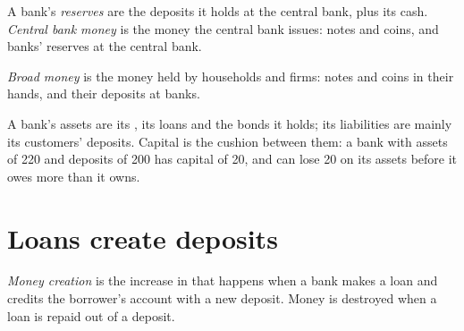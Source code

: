 \begin{definition}\label{def:g11:money-and-banking:reserves}
A bank's \emph{reserves} are the deposits it holds at the central bank, plus its cash. \emph{Central bank money}%
\label{def:g11:money-and-banking:central-bank-money} is the money the central bank issues: notes and coins, and banks' reserves at the central bank.
\end{definition}

\begin{definition}\label{def:g11:money-and-banking:broad-money}
\emph{Broad money} is the money held by households and firms: notes and coins in their hands, and their deposits at banks.
\end{definition}

A bank's assets are its , its loans and the bonds it holds; its liabilities are mainly its customers' deposits. Capital is the cushion between them: a bank with
assets of 220 and deposits of 200 has capital of 20, and can lose 20 on its assets before it owes more than it owns.

\section{Loans create deposits}\label{sec:g11:money-and-banking:creation}

\begin{definition}\label{def:g11:money-and-banking:money-creation}
\emph{Money creation} is the increase in  that happens when a bank makes a loan and credits the borrower's account with a new deposit.
Money is destroyed when a loan is repaid out of a deposit.
\end{definition}

